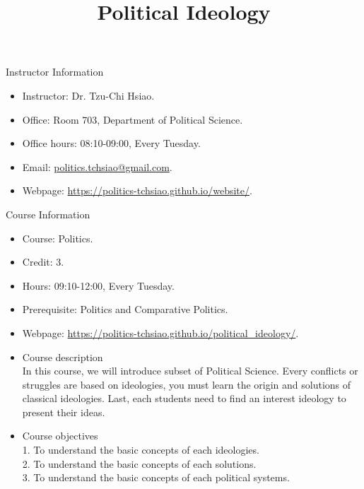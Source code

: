 \documentclass{article}
\title{\fontsize{16pt}{16pt}\selectfont Political Ideology}
\author{}
\date{}
\begin{document}
\maketitle
\fontsize{14pt}{14pt}\selectfont
Instructor Information \\
\begin{itemize}
\item Instructor: Dr. Tzu-Chi Hsiao. \\
\item Office: Room 703, Department of Political Science. \\
\item Office hours: 08:10-09:00, Every Tuesday. \\
\item Email: \href{mailto:politics.tchsiao@gmail.com}{politics.tchsiao@gmail.com}. \\
\item Webpage: \href{https://politics-tchsiao.github.io/website/}{https://politics-tchsiao.github.io/website/}. \\
\end{itemize}
Course Information \\
\begin{itemize}
\item Course: Politics. \\
\item Credit: 3. \\
\item Hours: 09:10-12:00, Every Tuesday. \\
\item Prerequisite: Politics and Comparative Politics. \\
\item Webpage: \href{https://politics-tchsiao.github.io/political_ideology/}{https://politics-tchsiao.github.io/political\_ideology/}. \\
\item Course description \\
In this course, we will introduce subset of Political Science. Every conflicts or struggles are based on ideologies, you must learn the origin and solutions of classical ideologies. Last, each students need to find an interest ideology to present their ideas. \\ 
\item Course objectives \\
1. To understand the basic concepts of each ideologies. \\
2. To understand the basic concepts of each solutions. \\
3. To understand the basic concepts of each political systems. \\
\end{itemize}
\end{document}

